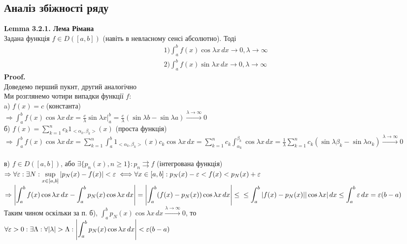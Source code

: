 \documentclass[a4paper, 10pt]{article}
\def\hugespace{\vspace{5mm} \\}
\theoremstyle{theoremdd}
\theoremstyle{theoremdd}
\theoremstyle{theoremdd}
\theoremstyle{theoremdd}
\theoremstyle{theoremdd}
\theoremstyle{theoremdd}
\theoremstyle{theoremdd}
\theoremstyle{theoremdd}
\begin{document}
\subsection{Аналіз збіжності ряду}
\textbf{Lemma 3.2.1. Лема Рімана}\\ Задана функція $f \in D([a,b])$ (навіть в невласному сенсі абсолютно). Тоді
\begin{align*}
1) \int_a^b f(x) \cos \lambda x \,dx \to 0, \lambda \to \infty \\
2) \int_a^b f(x) \sin \lambda x \,dx \to 0, \lambda \to \infty
\end{align*}
\textbf{Proof.}\\
Доведемо перший пукнт, другий аналогічно\\
Ми розглянемо чотири випадки функції $f$:\\
a) $f(x) = c$ (константа)\\
 $\Rightarrow \displaystyle \int_a^b f(x) \cos \lambda x \,dx = \frac{c}{\lambda} \sin \lambda x \Big|_{a}^b = \frac{c}{\lambda} \left(\sin \lambda b - \sin \lambda a \right) \overset{\lambda \to \infty}{\to} 0$
\hugespace
б) $\displaystyle f(x) = \sum_{k=1}^n c_k 1_{<\alpha_k, \beta_k>} (x)$ (проста функція)\\
$\Rightarrow \displaystyle \int_a^b f(x) \cos \lambda x \,dx = \sum_{k=1}^n \int_a^b 1_{<\alpha_k, \beta_k>} (x) c_k \cos \lambda x \,dx = \sum_{k=1}^n c_k \int_{\alpha_k}^{\beta_k} \cos \lambda x \,dx = \frac{1}{\lambda} \sum_{k=1}^n c_k (\sin \lambda \beta_k - \sin \lambda \alpha_k) \overset{\lambda \to \infty}{\to} 0$\\
\hugespace
в) $f \in D([a,b])$, або $\exists \{p_n(x), n \geq 1\}: p_n \rightrightarrows f$ (інтегрована функція)\\
$\Rightarrow \displaystyle \forall \varepsilon: \exists N: \sup_{x \in [a,b]} |p_N(x) - f(x)| < \varepsilon \iff \\ \forall x \in [a,b]: p_N(x) - \varepsilon <f(x) < p_N(x) + \varepsilon$\\
$\Rightarrow \displaystyle \abs{\int_a^b f(x) \cos \lambda x \,dx - \int_a^b p_N(x) \cos \lambda x \,dx} = \abs{\int_a^b (f(x) - p_N(x)) \cos \lambda x \,dx} \leq \\ \leq \int_a^b |f(x)-p_N(x)| |\cos \lambda x| \,dx \leq \int_a^b \varepsilon \,dx = \varepsilon(b-a)$\\
Таким чином оскільки за п. б), $\displaystyle \int_a^b p_N(x) \cos \lambda x \,dx \overset{\lambda \to \infty}{\to} 0$, то\\
$\displaystyle \forall \varepsilon>0: \exists \Lambda: \forall |\lambda| > \Lambda: \abs{\int_a^b p_N(x) \cos \lambda x \,dx} < \varepsilon(b-a)$\\
\end{document}
